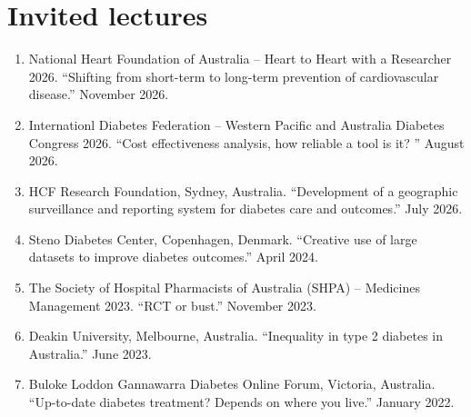 \documentclass[11pt]{article}
\begin{document}
\section*{Invited lectures}
\begin{enumerate}
\item National Heart Foundation of Australia -- Heart to Heart with a Researcher 2026. ``Shifting from short-term to long-term prevention of cardiovascular disease.'' November 2026.
\item Internationl Diabetes Federation -- Western Pacific and Australia Diabetes Congress 2026. ``Cost effectiveness analysis, how reliable a tool is it? '' August 2026.
\item HCF Research Foundation, Sydney, Australia. ``Development of a geographic surveillance and reporting system for diabetes care and outcomes.'' July 2026.
\item Steno Diabetes Center, Copenhagen, Denmark. ``Creative use of large datasets to improve diabetes outcomes.'' April 2024.
\item The Society of Hospital Pharmacists of Australia (SHPA) -- Medicines Management 2023. ``RCT or bust.'' November 2023.
\item Deakin University, Melbourne, Australia. ``Inequality in type 2 diabetes in Australia.'' June 2023. 
\item Buloke Loddon Gannawarra Diabetes Online Forum, Victoria, Australia. ``Up-to-date diabetes treatment? Depends on where you live.'' January 2022.  
\end{enumerate}
\end{document}
